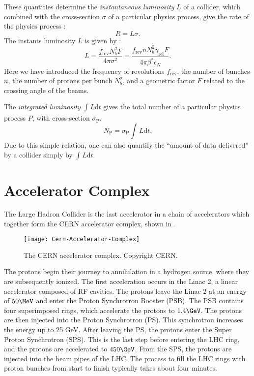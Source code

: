 These quantities determine the \textit{instantaneous luminosity} $L$ of a collider, which combined with the cross-section $\sigma$ of a particular physics process, give the rate of the physics process :
\begin{equation} \label{eq:rate}
R = L \sigma.
\end{equation}
The instants luminosity $L$ is given by :
\begin{equation}\label{eq:insta_lumi}
L = \frac{f_{\text{rev}} N_b^2 F}{4 \pi \sigma^2}= \frac{f_{\text{rev}} n N_b^2 \gamma_{\text{rel}} F }{ 4\pi \beta^* \epsilon_N}.
\end{equation}
Here we have introduced the frequency of revolutions $f_{\text{rev}}$, the number of bunches $n$, the number of protons per bunch $N_b^2$, and a geometric factor $F$ related to the crossing angle of the beams.

The \textit{integrated luminosity} $\int_{}^{} L \mathrm{d}t$ gives the total number of a particular physics process $P$, with cross-section $\sigma_{\text{P}}$.
\begin{equation}
N_{\text{P}} = \sigma_{\text{P}} \int_{}^{} L \mathrm{d}t.
\end{equation}
Due to this simple relation, one can also quantify the ``amount of data delivered'' by a collider simply by $\int_{}^{} L \mathrm{d}t$.

\section{Accelerator Complex}

The Large Hadron Collider is the last accelerator in a chain of accelerators which together form the CERN accelerator complex, shown in .
\begin{figure}
\caption{The CERN accelerator complex. Copyright CERN.}\label{fig:accelerator_complex}
\texttt{[image: Cern-Accelerator-Complex]}
\end{figure}
The protons begin their journey to annihilation in a hydrogen source, where they are subsequently ionized.
The first acceleration occurs in the Linac 2, a linear accelerator composed of RF cavities.
The protons leave the Linac 2 at an energy of $50 \MeV$ and enter the Proton Synchrotron Booster (PSB).
The PSB contains four superimposed rings, which accelerate the protons to $1.4 \GeV$.
The protons are then injected into the Proton Synchrotron (PS).
This synchrotron increases the energy up to 25 GeV.
After leaving the PS, the protons enter the Super Proton Synchrotron (SPS).
This is the last step before entering the LHC ring, and the protons are accelerated to $450 \GeV$.
From the SPS, the protons are injected into the beam pipes of the LHC.
The process to fill the LHC rings with proton bunches from start to finish typically takes about four minutes.

